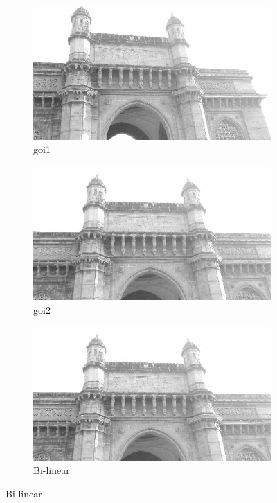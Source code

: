 \documentclass[a4paper]{article}
\begin{document}
\begin{figure}[H]
\begin{subfigure}{.4\textwidth}
  \centering
  \includegraphics[width=.8\linewidth]{goi1.jpg}  
  \caption{goi1}
  
\end{subfigure}
\begin{subfigure}{.4\textwidth}
  \centering
  \includegraphics[width=.8\linewidth]{goi2_downsampled.jpg}  
  \caption{goi2}
  
\end{subfigure}



\begin{subfigure}{.4\textwidth}
  \centering
  \includegraphics[width=.8\linewidth]{b.jpg}  
  \caption{Bi-linear}
  

\end{subfigure}
\end{figure}
\end{document}
